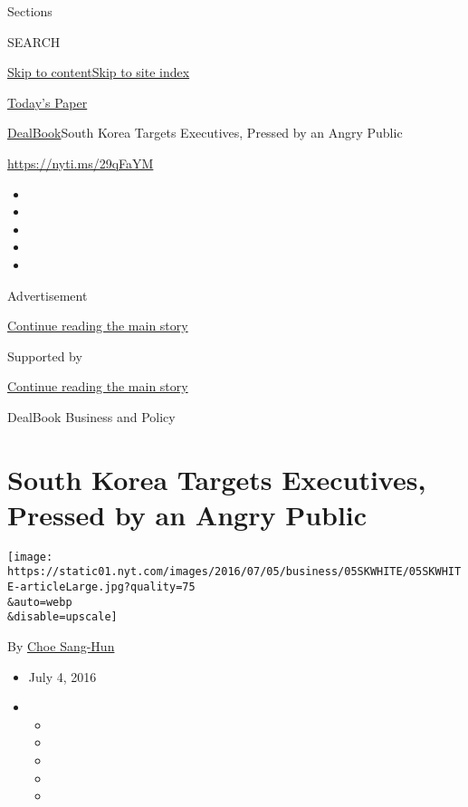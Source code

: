 Sections

SEARCH

\protect\hyperlink{site-content}{Skip to
content}\protect\hyperlink{site-index}{Skip to site index}

\href{https://myaccount.nytimes.com/auth/login?response_type=cookie\&client_id=vi}{}

\href{https://www.nytimes.com/section/todayspaper}{Today's Paper}

\href{/section/business/dealbook}{DealBook}\textbar{}South Korea Targets
Executives, Pressed by an Angry Public

\url{https://nyti.ms/29qFaYM}

\begin{itemize}
\item
\item
\item
\item
\item
\end{itemize}

Advertisement

\protect\hyperlink{after-top}{Continue reading the main story}

Supported by

\protect\hyperlink{after-sponsor}{Continue reading the main story}

DealBook Business and Policy

\hypertarget{south-korea-targets-executives-pressed-by-an-angry-public}{%
\section{South Korea Targets Executives, Pressed by an Angry
Public}\label{south-korea-targets-executives-pressed-by-an-angry-public}}

\texttt{[image: https://static01.nyt.com/images/2016/07/05/business/05SKWHITE/05SKWHITE-articleLarge.jpg?quality=75\\\&auto=webp\\\&disable=upscale]}

By \href{http://www.nytimes.com/by/choe-sang-hun}{Choe Sang-Hun}

\begin{itemize}
\item
  July 4, 2016
\item
  \begin{itemize}
  \item
  \item
  \item
  \item
  \item
  \end{itemize}
\end{itemize}


